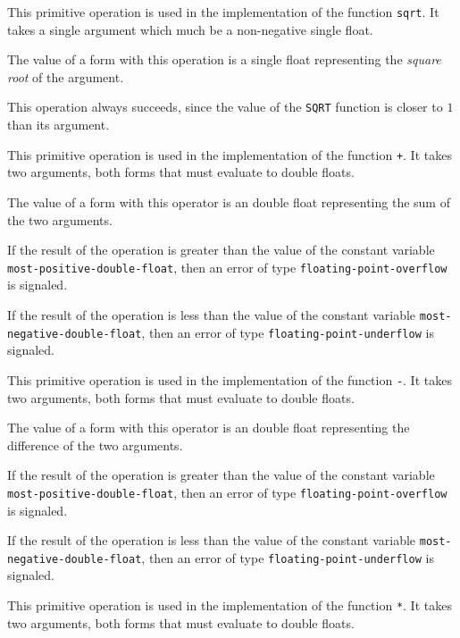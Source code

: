 
This primitive operation is used in the implementation of the
\commonlisp{} function \texttt{sqrt}.  It takes a single argument which
much be a non-negative single float.

The value of a form with this operation is a single float representing
the \emph{square root} of the argument.

This operation always succeeds, since the value of the \texttt{SQRT}
function is closer to $1$ than its argument.


This primitive operation is used in the implementation of the
\commonlisp{} function \texttt{+}.  It takes two arguments, both forms
that must evaluate to double floats.

The value of a form with this operator is an double float
representing the sum of the two arguments.

If the result of the operation is greater than the value of the
constant variable \texttt{most-positive-double-float}, then an error of
type \texttt{floating-point-overflow} is signaled.

If the result of the operation is less than the value of the
constant variable \texttt{most-negative-double-float}, then an error of
type \texttt{floating-point-underflow} is signaled.


This primitive operation is used in the implementation of the
\commonlisp{} function \texttt{-}.  It takes two arguments, both forms
that must evaluate to double floats.

The value of a form with this operator is an double float
representing the difference of the two arguments.

If the result of the operation is greater than the value of the
constant variable \texttt{most-positive-double-float}, then an error of
type \texttt{floating-point-overflow} is signaled.

If the result of the operation is less than the value of the
constant variable \texttt{most-negative-double-float}, then an error of
type \texttt{floating-point-underflow} is signaled.


This primitive operation is used in the implementation of the
\commonlisp{} function \texttt{*}.  It takes two arguments, both forms
that must evaluate to double floats.

